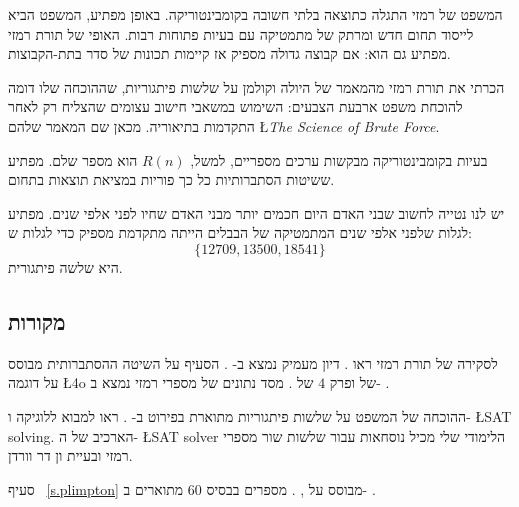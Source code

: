 המשפט של רמזי
התגלה כתוצאה בלתי חשובה בקומבינטוריקה. באופן מפתיע, המשפט הביא לייסוד תחום חדש ומרתק של מתמטיקה עם בעיות פתוחות רבות. האופי של תורת רמזי
מפתיע גם הוא: אם קבוצה גדולה מספיק אז קיימות תכונות של סדר בתת-הקבוצות.

הכרתי את תורת רמזי
מהמאמר של היולה וקולמן 
על שלשות פיתגוריות,
שההוכחה שלו דומה להוכחת משפט ארבעת הצבעים: השימוש במשאבי חישוב עצומים שהצליח רק לאחר התקדמות בתיאוריה. מכאן שם המאמר שלהם
\L{\textit{The Science of Brute Force}}.

בעיות בקומבינטוריקה מבקשות ערכים מספריים, למשל, 
$R(n)$
הוא מספר שלם. מפתיע ששיטות הסתברותיות כל כך פוריות במציאת תוצאות בתחום.

יש לנו נטייה לחשוב שבני האדם היום חכמים יותר מבני האדם שחיו לפני אלפי שנים. מפתיע לגלות שלפני אלפי שנים המתמטיקה של הבבלים הייתה מתקדמת מספיק כדי לגלות ש:
\[\{12709, 13500, 18541\}\]
היא שלשה פיתגורית. 

\subsection*{מקורות}

לסקירה של תורת רמזי
ראו
\cite{burton}.
דיון מעמיק נמצא ב-%
\cite{rudiments}.
הסעיף על השיטה ההסתברותית מבוסס על דוגמה
\L{4o}
של
\cite{ross}
ופרק
$4$
של
\cite{burton}.
מסד נתונים של מספרי רמזי
נמצא ב-%
\cite{mckay}.

ההוכחה של המשפט על שלשות פיתגוריות
מתוארת בפירוט ב-%
\cite{brute}.
ראו 
\cite{mlcs}
למבוא ללוגיקה ו-%
\L{SAT solving}.
הארכיב של ה-%
\L{SAT solver}
הלימודי שלי 
\cite{joss}
מכיל נוסחאות עבור שלשות שור
מספרי רמזי
ובעיית ון דר וורדן.

סעיף%
~\ref{s.plimpton}
מבוסס על
\cite{wiki:plimpton}, \cite{robson}. 
מספרים בבסיס
$60$
מתוארים ב-%
\cite{wiki:sexagesimal}.
